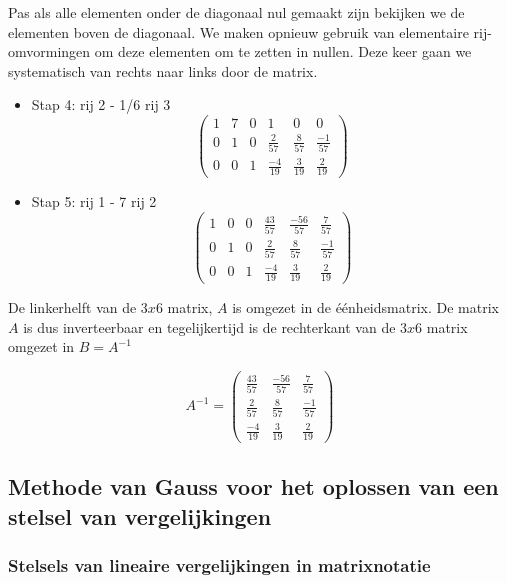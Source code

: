 \begin{voorbeeld}
Pas als alle elementen onder de diagonaal nul gemaakt zijn bekijken we de elementen boven de diagonaal. We maken opnieuw gebruik van elementaire rij-omvormingen om deze elementen om te zetten in nullen. Deze keer gaan we systematisch van rechts naar links door de matrix.

\begin{itemize}
	\item Stap 4: rij 2 - 1/6 rij 3
	\[ \left( \begin{matrix}
	1 & 7 & 0 & 1 & 0 & 0 \\
	0 & 1 & 0 & \frac{2}{57} & \frac{8}{57} & \frac{-1}{57} \\
	0 & 0 & 1 & \frac{-4}{19} & \frac{3}{19} & \frac{2}{19} \end{matrix} \right) 
	\]
	\item Stap 5: rij 1 - 7 rij 2
	\[ \left( \begin{matrix}
	1 & 0 & 0 & \frac{43}{57} & \frac{-56}{57} & \frac{7}{57} \\
	0 & 1 & 0 & \frac{2}{57} & \frac{8}{57} & \frac{-1}{57} \\
	0 & 0 & 1 & \frac{-4}{19} & \frac{3}{19} & \frac{2}{19} \end{matrix} \right) 
	\]
\end{itemize}

De linkerhelft van de $3x6$ matrix, $A$ is omgezet in de \'{e}\'{e}nheidsmatrix. De matrix $A$ is dus inverteerbaar en tegelijkertijd is de rechterkant van de $3x6$ matrix omgezet in $B=A^{-1}$

\[  A^{-1}=  \left( \begin{matrix}
\frac{43}{57} & \frac{-56}{57} & \frac{7}{57} \\
\frac{2}{57} & \frac{8}{57} & \frac{-1}{57} \\
\frac{-4}{19} & \frac{3}{19} & \frac{2}{19} \end{matrix} \right) 
\]

\end{voorbeeld}
\subsection{Methode van Gauss voor het oplossen van een stelsel van vergelijkingen}

\subsubsection{Stelsels van lineaire vergelijkingen in matrixnotatie}

